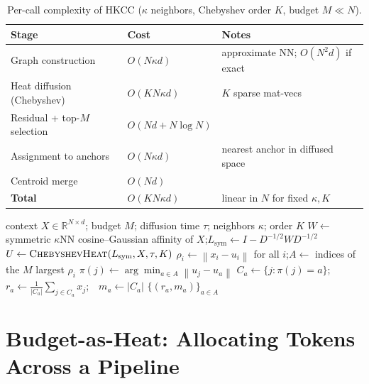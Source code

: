 \documentclass[11pt]{article}
\newcommand{\R}{\mathbb{R}}
\newcommand{\rwL}{\mathcal{L}}
\newcommand{\norm}[1]{\left\lVert#1\right\rVert}
\begin{document}
\begin{table}[t]
\centering
\caption{Per-call complexity of HKCC ($\kappa$ neighbors, Chebyshev order $K$, budget $M\!\ll\!N$).}
\label{tab:complexity}
\begin{tabular}{lll}
\toprule
Stage & Cost & Notes\\
\midrule
Graph construction & $O(N\kappa d)$ & approximate NN; $O(N^2 d)$ if exact\\
Heat diffusion (Chebyshev) & $O(KN\kappa d)$ & $K$ sparse mat-vecs\\
Residual + top-$M$ selection & $O(Nd+N\log N)$ & \\
Assignment to anchors & $O(N\kappa d)$ & nearest anchor in diffused space\\
Centroid merge & $O(Nd)$ & \\
\midrule
\textbf{Total} & $O(KN\kappa d)$ & linear in $N$ for fixed $\kappa,K$\\
\bottomrule
\end{tabular}
\end{table}

\begin{algorithm}[t]
\caption{Heat-Kernel Context Compression (HKCC)}
\label{alg:hkcc}
\begin{algorithmic}[1]
\Require context $X\in\R^{N\times d}$; budget $M$; diffusion time $\tau$; neighbors $\kappa$; order $K$
\State $W\gets$ symmetric $\kappa$NN cosine--Gaussian affinity of $X$;\quad $L_{\mathrm{sym}}\gets I-D^{-1/2}WD^{-1/2}$
\State $U\gets \textproc{ChebyshevHeat}(L_{\mathrm{sym}},X,\tau,K)$ \Comment{$U\approx e^{-\tau\rwL}X$, $O(KN\kappa d)$}
\State $\rho_i\gets\norm{x_i-u_i}$ for all $i$;\quad $A\gets$ indices of the $M$ largest $\rho_i$
 $\pi(j)\gets\arg\min_{a\in A}\norm{u_j-u_a}$ \EndFor
{}
  $C_a\gets\{j:\pi(j)=a\}$;\ \ $r_a\gets\tfrac{1}{|C_a|}\sum_{j\in C_a}x_j$;\ \ $m_a\gets|C_a|$
\EndFor
\State \Return $\{(r_a,m_a)\}_{a\in A}$ 
\end{algorithmic}
\end{algorithm}

\section{Budget-as-Heat: Allocating Tokens Across a Pipeline}
\label{sec:alloc}
\end{document}
